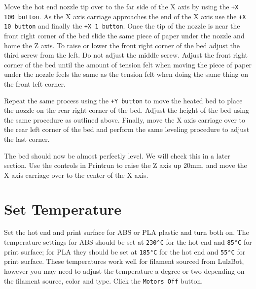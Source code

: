 Move the hot end nozzle tip over to the far side of the X axis by using the \texttt{+X 100 button}. As the X axis carriage approaches the end of the X axis use the \texttt{+X 10 button} and finally the \texttt{+X 1 button}. Once the tip of the nozzle is near the front right corner of the bed slide the same piece of paper under the nozzle and home the Z axis. To raise or lower the front right corner of the bed adjust the third screw from the left. Do not adjust the middle screw. Adjust the front right corner of the bed until the amount of tension felt when moving the piece of paper under the nozzle feels the same as the tension felt when doing the same thing on the front left corner.

Repeat the same process using the \texttt{+Y button} to move the heated bed to place the nozzle on the rear right corner of the bed. Adjust the height of the bed using the same procedure as outlined above. Finally, move the X axis carriage over to the rear left corner of the bed and perform the same leveling procedure to adjust the last corner.

The bed should now be almost perfectly level. We will check this in a later section. Use the controls in Printrun to raise the Z axis up 20mm, and move the X axis carriage over to the center of the X axis.

\section{Set Temperature}
Set the hot end and print surface for ABS or PLA plastic and turn both on. The temperature settings for ABS should be set at \texttt{230°C} for the hot end and \texttt{85°C} for print surface; for PLA they should be set at \texttt{185°C} for the hot end and \texttt{55°C} for print surface. These temperatures work well for filament sourced from LulzBot, however you may need to adjust the temperature a degree or two depending on the filament source, color and type. Click the \texttt{Motors Off} button.
